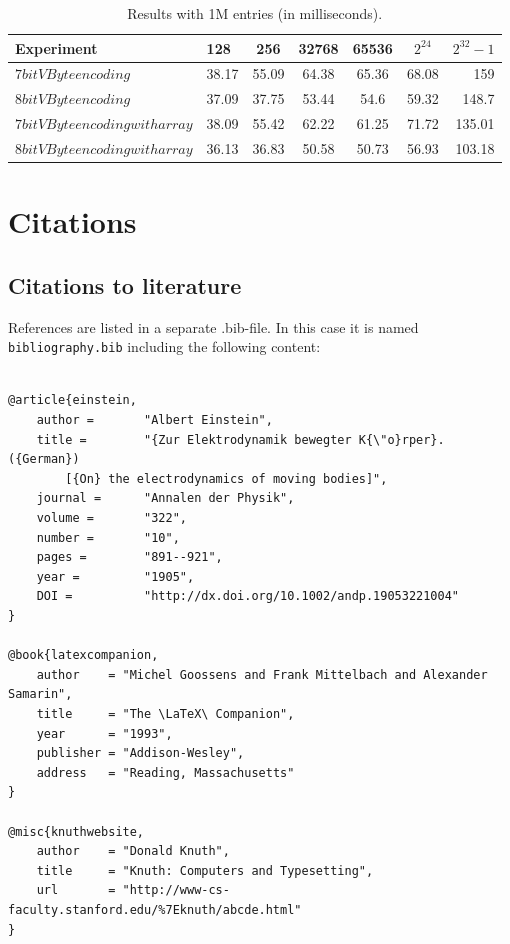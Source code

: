 \begin{table}
\centering
\caption{Results with 1M entries (in milliseconds).\label{table:results}}
\begin{tabular}{l||l c c c c r} 
Experiment & 128 & 256 & 32768 & 65536 & $2^{24}$ & $2^{32} -1$ \\ 
\hline \hline 
$7bit VByte encoding$ & 38.17 & 55.09 & 64.38 & 65.36 & 68.08 & 159 \\
$8bit VByte encoding$ & 37.09 & 37.75 & 53.44 & 54.6 & 59.32 & 148.7\\
$7bit VByte encoding with array$ & 38.09 & 55.42 & 62.22 & 61.25 & 71.72 & 135.01\\
$8bit VByte encoding with array$ & 36.13 & 36.83 & 50.58 & 50.73 & 56.93 & 103.18\\

\hline
%
\end{tabular}
\end{table}

\chapter{Citations}

\section{Citations to literature}

References are listed in a separate .bib-file. In this case it is named \texttt{bibliography.bib} including the following content:
\begin{verbatim}

@article{einstein,
    author =       "Albert Einstein",
    title =        "{Zur Elektrodynamik bewegter K{\"o}rper}. ({German})
        [{On} the electrodynamics of moving bodies]",
    journal =      "Annalen der Physik",
    volume =       "322",
    number =       "10",
    pages =        "891--921",
    year =         "1905",
    DOI =          "http://dx.doi.org/10.1002/andp.19053221004"
}
 
@book{latexcompanion,
    author    = "Michel Goossens and Frank Mittelbach and Alexander Samarin",
    title     = "The \LaTeX\ Companion",
    year      = "1993",
    publisher = "Addison-Wesley",
    address   = "Reading, Massachusetts"
}
 
@misc{knuthwebsite,
    author    = "Donald Knuth",
    title     = "Knuth: Computers and Typesetting",
    url       = "http://www-cs-faculty.stanford.edu/%7Eknuth/abcde.html"
}
\end{verbatim}

